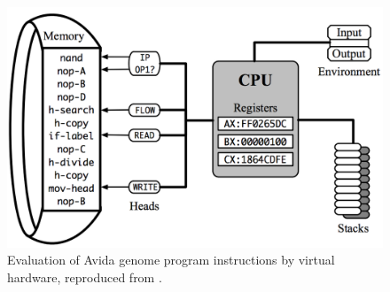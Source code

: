 \begin{figure}[h]
   \includegraphics[width=\columnwidth]{imgs/virtual_hardware}
  \caption{\small Evaluation of Avida genome program instructions by virtual hardware, reproduced from \citep{Ofria:2009avida}.}
  \label{fig:vhardware}
\end{figure}
